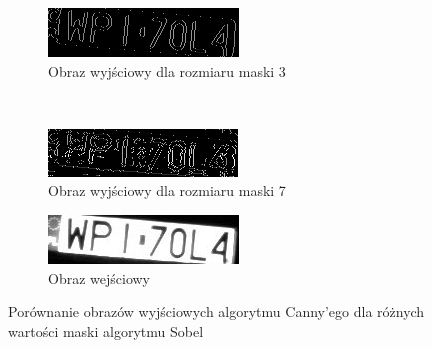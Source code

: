 \begin{figure}
  \centering
  \begin{subfigure}[b]{0.45\textwidth}
    \includegraphics[width=\textwidth]{img/results-canny-ok-sobel}
    \caption{Obraz wyjściowy dla rozmiaru maski 3}
    \label{fig:results_canny_ok_sobel}
  \end{subfigure}
  ~
  \begin{subfigure}[b]{0.45\textwidth}
    \includegraphics[width=\textwidth]{img/results-canny-bad-sobel}
    \caption{Obraz wyjściowy dla rozmiaru maski 7}
    \label{fig:results_canny_bad_sobel}
  \end{subfigure}
\begin{subfigure}[b]{0.45\textwidth}
    \includegraphics[width=\textwidth]{img/results-canny-input-sobel}
    \caption{Obraz wejściowy}
    \label{fig:results_canny_input_sobel}
  \end{subfigure}

  \caption{Porównanie obrazów wyjściowych algorytmu Canny'ego dla różnych wartości maski algorytmu Sobel}
  \label{fig:results_canny_sobel_compare}
\end{figure}


